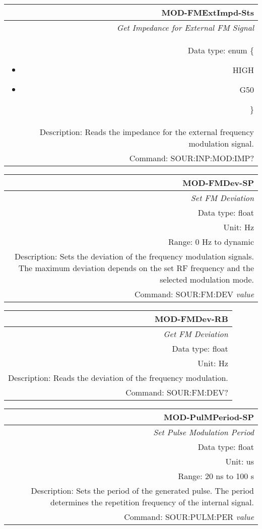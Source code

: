 \documentclass[openany]{article}
\begin{document}
		\begin{tabular}{N}
			\hline
			\bfseries MOD-FMExtImpd-Sts \\ \hline
			\emph{Get Impedance for External FM Signal} \\
			Data type: enum \{\begin{itemize}[noitemsep]
				\small
				\item[] HIGH
				\item[] G50
			\end{itemize}\} \\ 
			Description: Reads the impedance for the external frequency modulation signal. \\
			Command: SOUR:INP:MOD:IMP? \\

		\end{tabular}
%
		\begin{tabular}{N}
			\hline
			\bfseries MOD-FMDev-SP \\ \hline
			\emph{Set FM Deviation} \\
			Data type: float \\
			Unit: Hz \\  
			Range: 0 Hz to dynamic \\
			Description: Sets the deviation of the frequency modulation signals. The maximum deviation depends on the set RF frequency and the selected modulation mode. \\
			Command: SOUR:FM:DEV \emph{value} \\
			
		\end{tabular}


		\begin{tabular}{N}
			\hline
			\bfseries MOD-FMDev-RB \\ \hline
			\emph{Get FM Deviation} \\
			Data type: float \\
			Unit: Hz \\
			Description: Reads the deviation of the frequency modulation. \\
			Command: SOUR:FM:DEV? \\

		\end{tabular}
%
		\begin{tabular}{N}
			\hline
			\bfseries MOD-PulMPeriod-SP \\ \hline
			\emph{Set Pulse Modulation Period} \\
			Data type: float \\
			Unit: us \\ 
			Range: 20 ns to 100 s \\
			Description: Sets the period of the generated pulse. The period determines the repetition frequency of the internal signal. \\
			Command: SOUR:PULM:PER \emph{value} \\
			
		\end{tabular}
\end{document}
